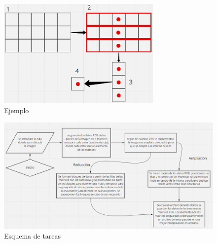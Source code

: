 \documentclass{article}
\begin{document}
	\begin{figure}[h]
	\includegraphics[width=8cm]{ejemplo.png}
	\centering
	\caption{Ejemplo}
	\label{fig:figura 1}
	\end{figure}
	
	\begin{figure}[h]
	\includegraphics[width=12cm]{algoritmo.png}
	\centering
	\caption{Esquema de tareas}
	\label{fig:figura 2}
	\end{figure}
	
\end{document}
